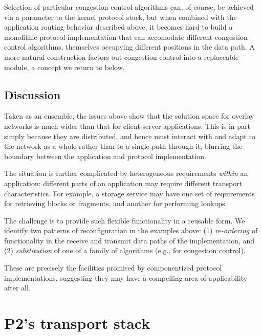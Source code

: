 Selection of particular congestion
control algorithms can, of course, be achieved via a parameter to the
kernel protocol stack, but when combined with the application
routing behavior described above, it becomes hard to build a
monolithic protocol implementation that can accomodate different
congestion control algorithms, themselves occupying different
positions in the data path.   A more natural construction factors out
congestion control into a replaceable module, a concept we return to
below. 

\subsection{Discussion}

Taken as an ensemble, the issues above show that the solution space
for overlay networks is much wider than that for client-server
applications.  This is in part simply because they are distributed,
and hence must interact with and adapt to the network as a whole
rather than to a single path through it,  blurring the boundary
between the application and protocol implementation.  

The situation is further complicated by heterogeneous requirements
\emph{within} an application: different parts of an
application may require different transport
characteristics. For example, a 
storage service may have one set of requirements for
retrieving blocks or fragments, and another for performing
lookups. 

The challenge is to provide such flexible functionality in a
reusable form.  We identify two patterns of reconfiguration in
the examples above: (1) \emph{re-ordering} of functionality
in the receive and transmit data paths of the implementation,  and
(2) \emph{substitution} of one of a family of algorithms (e.g., for
congestion control).

These are precisely the facilities promised by componentized protocol
implementations, suggesting they may have a compelling area of
applicability after all.  

\section{P2's transport stack}
\label{sec:p2}

